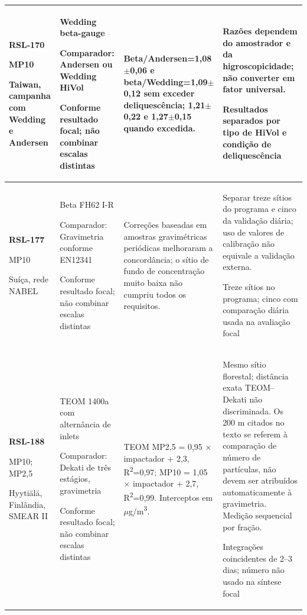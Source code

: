 \begin{longtable}{|P{0.18\textwidth}|P{0.25\textwidth}|P{0.28\textwidth}|P{\arrayrulewidth\relax}|}
\textbf{RSL-170}\par\textcite{rsl170}\par MP10\par Taiwan, campanha com Wedding e Andersen & Wedding beta-gauge\par\medskip Comparador: Andersen ou Wedding HiVol\par\medskip Conforme resultado focal; não combinar escalas distintas & Beta/Andersen=1,08\ensuremath{\pm}0,06 e beta/Wedding=1,09\ensuremath{\pm}0,12 sem exceder deliquescência; 1,21\ensuremath{\pm}0,22 e 1,27\ensuremath{\pm}0,15 quando excedida. & Razões dependem do amostrador e da higroscopicidade; não converter em fator universal.\par\medskip Resultados separados por tipo de HiVol e condição de deliquescência\\\hline
\textbf{RSL-177}\par\textcite{rsl177}\par MP10\par Suíça, rede NABEL & Beta FH62 I-R\par\medskip Comparador: Gravimetria conforme EN12341\par\medskip Conforme resultado focal; não combinar escalas distintas & Correções baseadas em amostras gravimétricas periódicas melhoraram a concordância; o sítio de fundo de concentração muito baixa não cumpriu todos os requisitos. & Separar treze sítios do programa e cinco da validação diária; uso de valores de calibração não equivale a validação externa.\par\medskip Treze sítios no programa; cinco com comparação diária usada na avaliação focal\\\hline
\textbf{RSL-188}\par\textcite{rsl188}\par MP10; MP2,5\par Hyytiälä, Finlândia, SMEAR II & TEOM 1400a com alternância de inlets\par\medskip Comparador: Dekati de três estágios, gravimetria\par\medskip Conforme resultado focal; não combinar escalas distintas & TEOM MP2,5 = 0,95 × impactador + 2,3, R\textsuperscript{2}=0,97; MP10 = 1,05 × impactador + 2,7, R\textsuperscript{2}=0,99. Interceptos em \ensuremath{\mu}g/m\textsuperscript{3}. & Mesmo sítio florestal; distância exata TEOM--Dekati não discriminada. Os 200 m citados no texto se referem à comparação de número de partículas, não devem ser atribuídos automaticamente à gravimetria. Medição sequencial por fração.\par\medskip Integrações coincidentes de 2--3 dias; número não usado na síntese focal\\\hline

\end{longtable}
